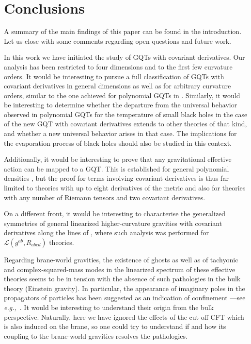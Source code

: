 \documentclass[11pt]{article}
\newcommand{\eg}{{\it e.g.,}\ }
\newcommand{\comment}[1]{{\bf [[[#1]]]}}
\begin{document}
{%
 
 



\section{Conclusions}\label{conclu}
A summary of the main findings of this paper can be found in the introduction. Let us close with some comments regarding open questions and future work. 

In this work we have initiated the study of GQTs with covariant derivatives. Our analysis has been restricted to four dimensions and to the first few curvature orders. It would be interesting to pursue a full classification of GQTs with covariant derivatives in general dimensions as well as for arbitrary curvature orders, similar to the one achieved for polynomial GQTs in \cite{Bueno:2022res,Moreno:2023rfl}. Similarly, it would be interesting to determine whether the departure from the universal behavior observed in polynomial GQTs for the temperature of small black holes in the case of the new GQT with covariant derivatives extends to other theories of that kind, and whether a new universal behavior arises in that case. The implications for the evaporation process of black holes should also be studied in this context. 

Additionally, it would be interesting to prove that any gravitational effective action can be mapped to a GQT. This is established for general polynomial densities \cite{Bueno:2019ltp}, but the proof for terms involving covariant derivatives is thus far limited to theories with up to eight derivatives  of  the metric and also for theories with any number of Riemann tensors and two covariant derivatives.

On a different front, it would be interesting to characterise the generalized symmetries of general linearized higher-curvature gravities with covariant derivatives along the lines of \cite{Benedetti:2023ipt}, where such analysis was performed for $\mathcal{L}(g^{ab},R_{abcd})$ theories.

Regarding brane-world gravities, the existence of ghosts as well as of tachyonic and complex-squared-mass modes in the linearized spectrum of these effective theories seems to be in tension with the absence of such pathologies in the bulk theory (Einstein gravity).  In particular, the appearance of imaginary poles in the propagators of particles has been suggested as an indication of confinement ---see \eg \cite{Stainsby:1990fh,Maris:1995ns,Hayashi:2021nnj}. 
It would be interesting to understand their origin from the bulk perspective. Naturally, here we have ignored the effects of the cut-off CFT which is also induced on the brane, so one could try to understand if and how its coupling to the brane-world gravities resolves the pathologies.









}
\end{document}
